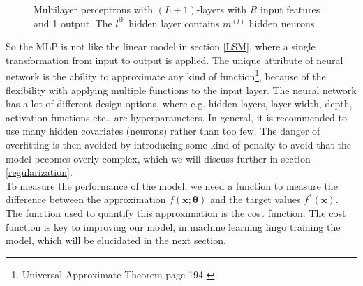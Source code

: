 \begin{figure}[th]
	\caption[Multilayer Perceptrons with $(L+1)$-layers]{Multilayer perceptrons with $(L+1)$-layers with $R$ input features and 1 output. The $l^{\text{th}}$ hidden layer contains $m^{(l)}$ hidden neurons}
	\label{fig:multilayer-perceptron}
\end{figure}

So the MLP is not like the linear model in section \ref{LSM}, where a single transformation from input to output is applied. The unique attribute of neural network is the ability to approximate any kind of function\footnote{Universal Approximate Theorem page 194 \parencite{Goodfellow-et-al-2016}}, because of the flexibility with applying multiple functions to the input layer. The neural network has a lot of different design options, where e.g. hidden layers, layer width, depth, activation functions etc., are hyperparameters. In general, it is recommended to use many hidden covariates (neurons) rather than too few. The danger of overfitting is then avoided by introducing some kind of penalty to avoid that the model becomes overly complex, which we will discuss further in section \ref{regularization}.\\

To measure the performance of the model, we need a function to measure the difference between the approximation $f(\bm{x};\bm{\theta})$ and the target values $f^*(\bm{x})$. The function used to quantify this approximation is the cost function. The cost function is key to improving our model, in machine learning lingo training the model, which will be elucidated in the next section.

